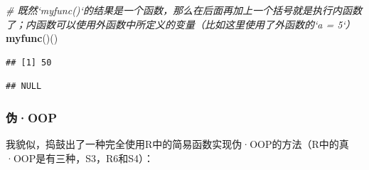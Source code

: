 \documentclass[]{book}
\newenvironment{Shaded}{\begin{snugshade}}{\end{snugshade}}
\newcommand{\CommentTok}[1]{\textcolor[rgb]{0.56,0.35,0.01}{\textit{#1}}}
\newcommand{\ControlFlowTok}[1]{\textcolor[rgb]{0.13,0.29,0.53}{\textbf{#1}}}
\newcommand{\KeywordTok}[1]{\textcolor[rgb]{0.13,0.29,0.53}{\textbf{#1}}}
\newcommand{\NormalTok}[1]{#1}
\newcommand{\OperatorTok}[1]{\textcolor[rgb]{0.81,0.36,0.00}{\textbf{#1}}}
\newcommand{\StringTok}[1]{\textcolor[rgb]{0.31,0.60,0.02}{#1}}
\begin{document}
\begin{Shaded}
\begin{Highlighting}[]
\CommentTok{# 既然`myfunc()`的结果是一个函数，那么在后面再加上一个括号就是执行内函数了；内函数可以使用外函数中所定义的变量（比如这里使用了外函数的`a = 5`）}
\KeywordTok{myfunc}\NormalTok{()()}
\end{Highlighting}
\end{Shaded}

\begin{verbatim}
## [1] 50
\end{verbatim}

\begin{Shaded}
\end{Shaded}

\begin{verbatim}
## NULL
\end{verbatim}

\hypertarget{oop}{%
\subsubsection{伪·OOP}\label{oop}}

我貌似，捣鼓出了一种完全使用R中的简易函数实现伪·OOP的方法（R中的真·OOP是有三种，S3，R6和S4）：
\end{document}
